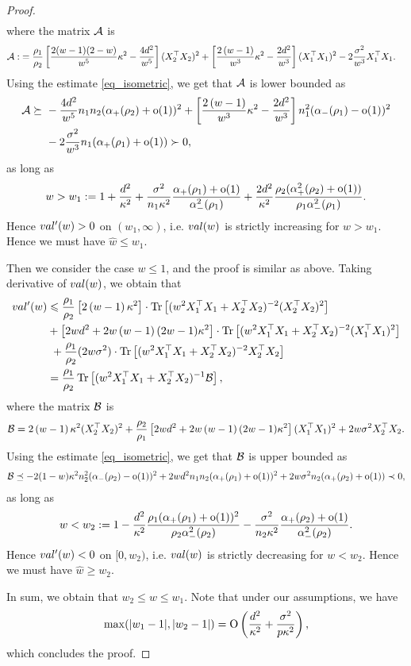 \begin{proof}
\begin{align*}
\end{align*}
where the matrix $\cal A$ is
\begin{align*}
\cal A :&= \frac{\rho_1}{\rho_2}\left[ \frac{2(w-1)(2-w)}{w^5}\kappa^2 - \frac{4d^2}{w^5}\right](X_2^{\top}X_2)^2 + \left[\frac{2\left( w-1\right)}{w^3}\kappa^2 - \frac{2d^2}{w^3} \right](X_1^{\top}X_1)^2 - 2 \frac{\sigma^2}{w^3}X_1^\top X_1.
\end{align*}
Using the estimate \eqref{eq_isometric}, we get that $\cal A$ is lower bounded as
\begin{align*}
\cal A \succeq&~ - \frac{4d^2}{w^5}n_1n_2 (\al_+(\rho_2)+\oo(1))^2 + \left[\frac{2\left( w-1\right)}{w^3}\kappa^2 - \frac{2d^2}{w^3} \right]n_1^2 (\al_-(\rho_1)-\oo(1))^2 \\
&~ - 2 \frac{\sigma^2}{w^3}n_1(\al_{+}(\rho_1)+\oo(1)) \succ 0,
\end{align*}
as long as
$$w> w_1:=1 +\frac{d^2}{\kappa^2}+ \frac{\sigma^2}{n_1\kappa^2}\frac{\al_{+}(\rho_1)+\oo(1)}{\al_{-}^2(\rho_1)} + \frac{2d^2}{\kappa^2}\frac{\rho_2(\al_+^2(\rho_2)+\oo(1))}{\rho_1\al_-^2(\rho_1) }.$$
Hence $\val'(w)>0$ on $(w_1,\infty)$, i.e. $\val(w)$ is strictly increasing for $w>w_1$. Hence we must have $\hat w\le w_1$. 

Then we consider the case $w\le 1$, and the proof is similar as above. Taking derivative of $\val(w)$, we obtain that
\begin{align}
	\val'(w) &\le \frac{\rho_1}{\rho_2} \left[2\left( w-1\right) \kappa^2\right]\cdot \tr\left[( w^2X_1^{\top}X_1 +X_2^{\top}X_2)^{-2} (X_2^{\top}X_2)^2\right] \nonumber \\
	& +  \left[2wd^2 +2w\left( w-1\right)(2w-1)\kappa^2\right]\cdot \tr\left[( w^2X_1^{\top}X_1 +X_2^{\top}X_2)^{-2} (X_1^{\top}X_1)^2\right] \nonumber\\
	&~ + \frac{\rho_1}{\rho_2}(2 w\sigma^2) \cdot \bigtr{(w^2X_1^{\top}X_1 + X_2^{\top}X_2)^{-2} X_2^\top X_2  }\\
			& = \frac{\rho_1}{\rho_2} \bigtr{(w^2X_1^{\top}X_1  + X_2^{\top}X_2)^{-1} \cal B} , \nonumber
\end{align}
where the matrix $\cal B$ is
$$\cal B= 2\left( w-1\right) \kappa^2  (X_2^{\top}X_2)^2+\frac{\rho_2}{\rho_1}\left[2wd^2 +2w\left( w-1\right)(2w-1)\kappa^2\right](X_1^{\top}X_1)^2 + 2 w\sigma^2 X_2^\top X_2 .$$
Using the estimate \eqref{eq_isometric}, we get that $\cal B$ is upper bounded as
\begin{align*}
\cal B \preceq - 2(1-w)\kappa^2 n_2^2 (\al_-(\rho_2) -\oo(1))^2 +2w d^2 n_1n_2 (\al_+(\rho_1) +\oo(1))^2 + 2w\sigma^2 n_2 (\al_+(\rho_2)+\oo(1)) \prec 0,
\end{align*}
as long as
$$w< w_2:=1 -   \frac{d^2}{\kappa^2}\frac{\rho_1(\al_+(\rho_1) +\oo(1))^2}{\rho_2 \al_-^2(\rho_2) } -  \frac{\sigma^2}{n_2\kappa^2}\frac{\al_{+}(\rho_2)+\oo(1)}{\al_{-}^2(\rho_2)} .$$
Hence $\val'(w)<0$ on $[0,w_2)$, i.e. $\val(w)$ is strictly decreasing for $w<w_2$. Hence we must have $\hat w\ge w_2$. 

In sum, we obtain that $w_2\le w\le w_1$. Note that under our assumptions, we have 
$$\max(|w_1 -1|, |w_2 -1|) =\OO\left(\frac{d^2}{\kappa^2} + \frac{\sigma^2}{p\kappa^2}\right),$$
which concludes the proof.
\end{proof}

